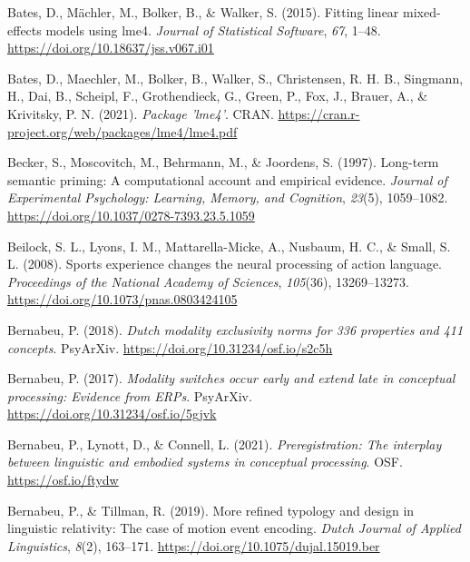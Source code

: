 \documentclass[
  12pt,
  man,floatsintext]{apa7}
\newlength{\cslhangindent}
\newlength{\cslentryspacingunit} %
\newenvironment{CSLReferences}[2] %
 {%
  \setlength{\parindent}{0pt}
  \ifodd #1
  \let\oldpar\par
  \def\par{\hangindent=\cslhangindent\oldpar}
  \fi
  \setlength{\parskip}{#2\cslentryspacingunit}
 }%
 {}
\begin{document}
\begin{CSLReferences}{1}{0}
\leavevmode{}%
Bates, D., Mächler, M., Bolker, B., \& Walker, S. (2015). Fitting linear mixed-effects models using {lme4}. \emph{Journal of Statistical Software}, \emph{67}, 1--48. \url{https://doi.org/10.18637/jss.v067.i01}

\leavevmode{}%
Bates, D., Maechler, M., Bolker, B., Walker, S., Christensen, R. H. B., Singmann, H., Dai, B., Scheipl, F., Grothendieck, G., Green, P., Fox, J., Brauer, A., \& Krivitsky, P. N. (2021). \emph{Package '{lme4}'}. {CRAN}. \url{https://cran.r-project.org/web/packages/lme4/lme4.pdf}

\leavevmode{}%
Becker, S., Moscovitch, M., Behrmann, M., \& Joordens, S. (1997). Long-term semantic priming: {A} computational account and empirical evidence. \emph{Journal of Experimental Psychology: Learning, Memory, and Cognition}, \emph{23}(5), 1059--1082. \url{https://doi.org/10.1037/0278-7393.23.5.1059}

\leavevmode{}%
Beilock, S. L., Lyons, I. M., Mattarella-Micke, A., Nusbaum, H. C., \& Small, S. L. (2008). Sports experience changes the neural processing of action language. \emph{Proceedings of the National Academy of Sciences}, \emph{105}(36), 13269--13273. \url{https://doi.org/10.1073/pnas.0803424105}

\leavevmode{}%
Bernabeu, P. (2018). \emph{Dutch modality exclusivity norms for 336 properties and 411 concepts}. {PsyArXiv}. \url{https://doi.org/10.31234/osf.io/s2c5h}

\leavevmode{}%
Bernabeu, P. (2017). \emph{Modality switches occur early and extend late in conceptual processing: Evidence from ERPs}. {PsyArXiv}. \url{https://doi.org/10.31234/osf.io/5gjvk}

\leavevmode{}%
Bernabeu, P., Lynott, D., \& Connell, L. (2021). \emph{Preregistration: {The} interplay between linguistic and embodied systems in conceptual processing}. {OSF}. \url{https://osf.io/ftydw}

\leavevmode{}%
Bernabeu, P., \& Tillman, R. (2019). More refined typology and design in linguistic relativity: {The} case of motion event encoding. \emph{Dutch Journal of Applied Linguistics}, \emph{8}(2), 163--171. \url{https://doi.org/10.1075/dujal.15019.ber}


\end{CSLReferences}
\end{document}
